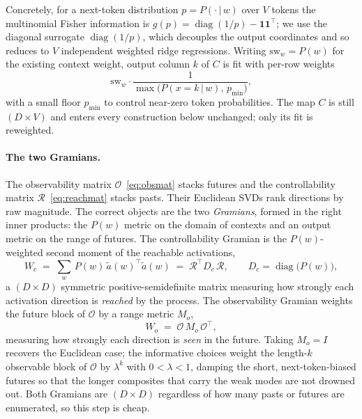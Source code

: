 \documentclass[11pt]{article}
\begin{document}
Concretely, for a next-token distribution $p=P(\cdot\,|\,w)$ over $V$ tokens the multinomial
Fisher information is $g(p)=\operatorname{diag}(1/p)-\mathbf 1\mathbf 1^\top$; we use the
diagonal surrogate $\operatorname{diag}(1/p)$, which decouples the output coordinates and so
reduces to $V$ independent weighted ridge regressions. Writing $\mathrm{sw}_w=P(w)$ for the
existing context weight, output column $k$ of $C$ is fit with per-row weights
\begin{equation}
\mathrm{sw}_w \cdot \frac{1}{\max\!\bigl(P(x{=}k\,|\,w),\,p_{\min}\bigr)} ,
\label{eq:fisher-weight}
\end{equation}
with a small floor $p_{\min}$ to control near-zero token probabilities. The map $C$ is still
$(D\times V)$ and enters every construction below unchanged; only its fit is reweighted.

\paragraph{The two Gramians.}
The observability matrix $\mathcal{O}$~\eqref{eq:obsmat} stacks futures and the
controllability matrix $\mathcal{R}$~\eqref{eq:reachmat} stacks pasts. Their Euclidean SVDs
rank directions by raw magnitude. The correct objects are the two \emph{Gramians}, formed in
the right inner products: the $P(w)$ metric on the domain of contexts and an output metric on
the range of futures. The controllability Gramian is the $P(w)$-weighted second moment of the
reachable activations,
\begin{equation}
W_c \;=\; \sum_{w}\,P(w)\,\widetilde a(w)^{\!\top}\widetilde a(w)
\;=\;\mathcal{R}^{\!\top} D_c\,\mathcal{R},
\qquad D_c=\operatorname{diag}\bigl(P(w)\bigr),
\label{eq:Wc}
\end{equation}
a $(D\times D)$ symmetric positive-semidefinite matrix measuring how strongly each activation
direction is \emph{reached} by the process. The observability Gramian weights the future
block of $\mathcal{O}$ by a range metric $M_o$,
\begin{equation}
W_o \;=\; \mathcal{O}\,M_o\,\mathcal{O}^{\!\top},
\label{eq:Wo}
\end{equation}
measuring how strongly each direction is \emph{seen} in the future. Taking $M_o=I$ recovers
the Euclidean case; the informative choices weight the length-$k$ observable block of
$\mathcal{O}$ by $\lambda^{k}$ with $0<\lambda<1$, damping the short, next-token-biased
futures so that the longer composites that carry the weak modes are not drowned out. Both
Gramians are $(D\times D)$ regardless of how many pasts or futures are enumerated, so this
step is cheap.
\end{document}
